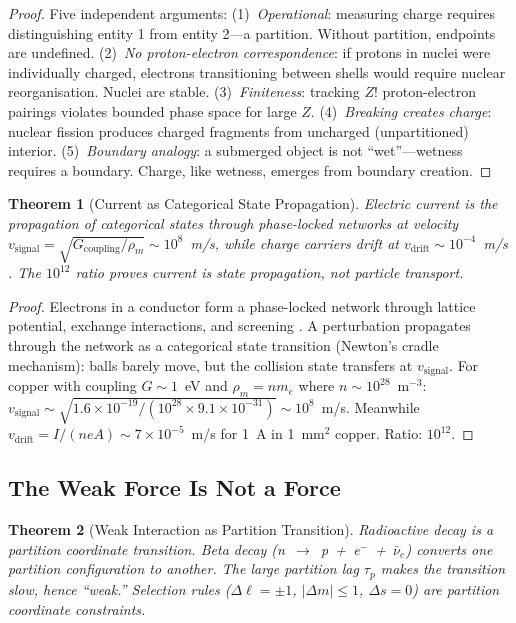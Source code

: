 \documentclass[11pt,twocolumn,a4paper]{article}
\newtheorem{theorem}{Theorem}[section]
\theoremstyle{definition}
\theoremstyle{remark}
\newcommand{\taup}{\tau_p}
\begin{document}
\begin{proof}
Five independent arguments: (1)~\emph{Operational}: measuring charge requires distinguishing entity 1 from entity 2---a partition. Without partition, endpoints are undefined. (2)~\emph{No proton-electron correspondence}: if protons in nuclei were individually charged, electrons transitioning between shells would require nuclear reorganisation. Nuclei are stable. (3)~\emph{Finiteness}: tracking $Z!$ proton-electron pairings violates bounded phase space for large $Z$. (4)~\emph{Breaking creates charge}: nuclear fission produces charged fragments from uncharged (unpartitioned) interior. (5)~\emph{Boundary analogy}: a submerged object is not ``wet''---wetness requires a boundary. Charge, like wetness, emerges from boundary creation.
\end{proof}

\begin{theorem}[Current as Categorical State Propagation]
\label{thm:current}
Electric current is the propagation of categorical states through phase-locked networks at velocity $v_{\mathrm{signal}} = \sqrt{G_{\mathrm{coupling}}/\rho_m} \sim 10^8$~m/s, while charge carriers drift at $v_{\mathrm{drift}} \sim 10^{-4}$~m/s \citep{drude1900, ashcroft1976}. The $10^{12}$ ratio proves current is state propagation, not particle transport.
\end{theorem}

\begin{proof}
Electrons in a conductor form a phase-locked network through lattice potential, exchange interactions, and screening \citep{ashcroft1976}. A perturbation propagates through the network as a categorical state transition (Newton's cradle mechanism): balls barely move, but the collision state transfers at $v_{\mathrm{signal}}$. For copper with coupling $G \sim 1$~eV and $\rho_m = nm_e$ where $n \sim 10^{28}$~m$^{-3}$: $v_{\mathrm{signal}} \sim \sqrt{1.6\times 10^{-19}/(10^{28}\times 9.1\times 10^{-31})} \sim 10^8$~m/s. Meanwhile $v_{\mathrm{drift}} = I/(neA) \sim 7\times 10^{-5}$~m/s for 1~A in 1~mm$^2$ copper. Ratio: $10^{12}$.
\end{proof}

\subsection{The Weak Force Is Not a Force}

\begin{theorem}[Weak Interaction as Partition Transition]
Radioactive decay is a partition coordinate transition. Beta decay (n~$\to$~p~+~e$^-$~+~$\bar{\nu}_e$) converts one partition configuration to another. The large partition lag $\taup$ makes the transition slow, hence ``weak.'' Selection rules ($\Delta\ell = \pm 1$, $|\Delta m| \leq 1$, $\Delta s = 0$) are partition coordinate constraints.
\end{theorem}
\end{document}
